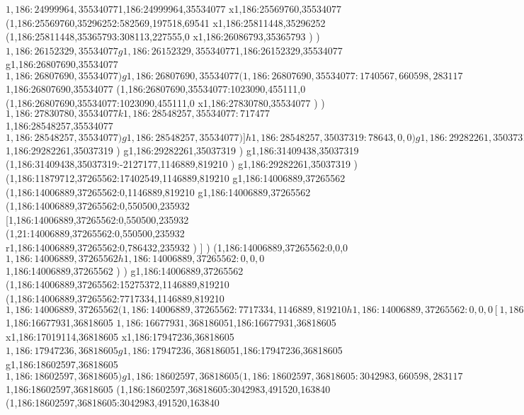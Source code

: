 {$1,186:24999964,35534077
$1,186:24999964,35534077
x1,186:25569760,35534077
(1,186:25569760,35296252:582569,197518,69541
x1,186:25811448,35296252
(1,186:25811448,35365793:308113,227555,0
x1,186:26086793,35365793
)
)
$1,186:26152329,35534077
g1,186:26152329,35534077
$1,186:26152329,35534077
g1,186:26807690,35534077
$1,186:26807690,35534077
)
g1,186:26807690,35534077
(1,186:26807690,35534077:1740567,660598,283117
$1,186:26807690,35534077
(1,186:26807690,35534077:1023090,455111,0
(1,186:26807690,35534077:1023090,455111,0
x1,186:27830780,35534077
)
)
$1,186:27830780,35534077
k1,186:28548257,35534077:717477
$1,186:28548257,35534077
$1,186:28548257,35534077
)
g1,186:28548257,35534077
)
]
h1,186:28548257,35037319:78643,0,0
)
g1,186:29282261,35037319
)
$1,186:29282261,35037319
)
g1,186:29282261,35037319
)
g1,186:31409438,35037319
(1,186:31409438,35037319:-2127177,1146889,819210
)
g1,186:29282261,35037319
)
(1,186:11879712,37265562:17402549,1146889,819210
g1,186:14006889,37265562
(1,186:14006889,37265562:0,1146889,819210
g1,186:14006889,37265562
(1,186:14006889,37265562:0,550500,235932
[1,186:14006889,37265562:0,550500,235932
(1,21:14006889,37265562:0,550500,235932
r1,186:14006889,37265562:0,786432,235932
)
]
)
(1,186:14006889,37265562:0,0,0
$1,186:14006889,37265562
h1,186:14006889,37265562:0,0,0
$1,186:14006889,37265562
)
)
g1,186:14006889,37265562
(1,186:14006889,37265562:15275372,1146889,819210
(1,186:14006889,37265562:7717334,1146889,819210
$1,186:14006889,37265562
(1,186:14006889,37265562:7717334,1146889,819210
h1,186:14006889,37265562:0,0,0
[1,186:14006889,37265562:361814,610631,0
(1,186:14023956,37092619:0,437688,0
x1,186:14351637,37092619
)
(1,186:14006889,37265562:361814,455111,0
x1,186:14348072,37265562
)
]
x1,186:15276194,37265562
g1,186:15458234,37265562
x1,186:15967960,37265562
g1,186:16150000,37265562
(1,186:16150000,37265562:5574223,1146889,819210
(1,186:16150000,36144886:527931,26213,1939886
x1,186:16677931,36144886
)
[1,186:16677931,37265562:4967649,1107555,779875
(1,186:16677931,36818605:4967649,660598,283117
g1,186:16677931,36818605
(1,186:16677931,36818605:1924666,660598,283117
r1,186:16677931,36818605:0,943715,283117
$1,186:16677931,36818605
$1,186:16677931,36818605
$1,186:16677931,36818605
x1,186:17019114,36818605
x1,186:17947236,36818605
$1,186:17947236,36818605
g1,186:17947236,36818605
$1,186:17947236,36818605
g1,186:18602597,36818605
$1,186:18602597,36818605
)
g1,186:18602597,36818605
(1,186:18602597,36818605:3042983,660598,283117
$1,186:18602597,36818605
(1,186:18602597,36818605:3042983,491520,163840
(1,186:18602597,36818605:3042983,491520,163840
}
